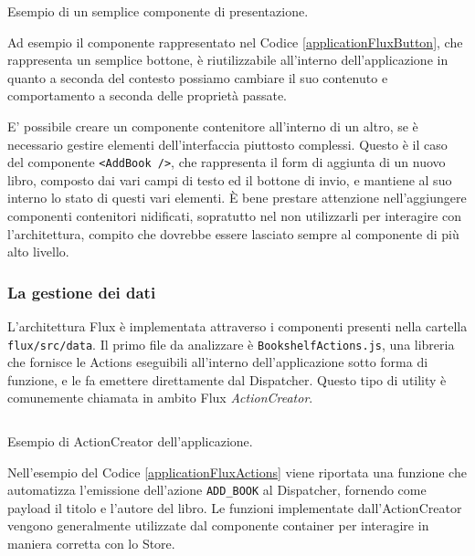 \begin{listing}[ht]
\inputminted{jsx}{sources/applicationFluxButton.js}
\caption{Esempio di un semplice componente di presentazione.} 
\label{applicationFluxButton} 
\end{listing} 

Ad esempio il componente rappresentato nel Codice \ref{applicationFluxButton}, che rappresenta un semplice bottone, è riutilizzabile all'interno dell'applicazione in quanto a seconda del contesto possiamo cambiare il suo contenuto e comportamento a seconda delle proprietà passate.

E' possibile creare un componente contenitore all'interno di un altro, se è necessario gestire elementi dell'interfaccia piuttosto complessi. Questo è il caso del componente \texttt{<AddBook />}, che rappresenta il form di aggiunta di un nuovo libro, composto dai vari campi di testo ed il bottone di invio, e mantiene al suo interno lo stato di questi vari elementi. È bene prestare attenzione nell'aggiungere componenti contenitori nidificati, sopratutto nel non utilizzarli per interagire con l'architettura, compito che dovrebbe essere lasciato sempre al componente di più alto livello.

\subsubsection*{La gestione dei dati}
L'architettura Flux è implementata attraverso i componenti presenti nella cartella \texttt{flux/src/data}. Il primo file da analizzare è \texttt{BookshelfActions.js}, una libreria che fornisce le Actions eseguibili all'interno dell'applicazione sotto forma di funzione, e le fa emettere direttamente dal Dispatcher. Questo tipo di utility è comunemente chiamata in ambito Flux \textit{ActionCreator}.

\begin{listing}[ht]
\inputminted{jsx}{sources/applicationFluxActions.js}
\caption{Esempio di ActionCreator dell'applicazione.} 
\label{applicationFluxActions} 
\end{listing} 

Nell'esempio del Codice \ref{applicationFluxActions} viene riportata una funzione che automatizza l'emissione dell'azione \texttt{ADD_BOOK} al Dispatcher, fornendo come payload il titolo e l'autore del libro.
Le funzioni implementate dall'ActionCreator vengono generalmente utilizzate dal componente container per interagire in maniera corretta con lo Store.

